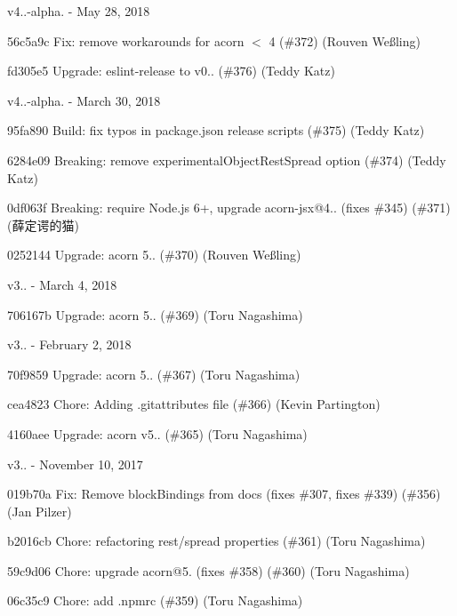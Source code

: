 v4..-\/alpha. -\/ May 28, 2018


\begin{DoxyItemize}
\item 56c5a9c Fix\+: remove workarounds for acorn $<$ 4 (\#372) (Rouven Weßling)
\item fd305e5 Upgrade\+: eslint-\/release to v0.. (\#376) (Teddy Katz)
\end{DoxyItemize}

v4..-\/alpha. -\/ March 30, 2018


\begin{DoxyItemize}
\item 95fa890 Build\+: fix typos in package.\+json release scripts (\#375) (Teddy Katz)
\item 6284e09 Breaking\+: remove experimental\+Object\+Rest\+Spread option (\#374) (Teddy Katz)
\item 0df063f Breaking\+: require Node.\+js 6+, upgrade acorn-\/jsx@4.. (fixes \#345) (\#371) (薛定谔的猫)
\item 0252144 Upgrade\+: acorn 5.. (\#370) (Rouven Weßling)
\end{DoxyItemize}

v3.. -\/ March 4, 2018


\begin{DoxyItemize}
\item 706167b Upgrade\+: acorn 5.. (\#369) (Toru Nagashima)
\end{DoxyItemize}

v3.. -\/ February 2, 2018


\begin{DoxyItemize}
\item 70f9859 Upgrade\+: acorn 5.. (\#367) (Toru Nagashima)
\item cea4823 Chore\+: Adding .gitattributes file (\#366) (Kevin Partington)
\item 4160aee Upgrade\+: acorn v5.. (\#365) (Toru Nagashima)
\end{DoxyItemize}

v3.. -\/ November 10, 2017


\begin{DoxyItemize}
\item 019b70a Fix\+: Remove block\+Bindings from docs (fixes \#307, fixes \#339) (\#356) (Jan Pilzer)
\item b2016cb Chore\+: refactoring rest/spread properties (\#361) (Toru Nagashima)
\item 59c9d06 Chore\+: upgrade acorn@5. (fixes \#358) (\#360) (Toru Nagashima)
\item 06c35c9 Chore\+: add .npmrc (\#359) (Toru Nagashima)
\end{DoxyItemize}


